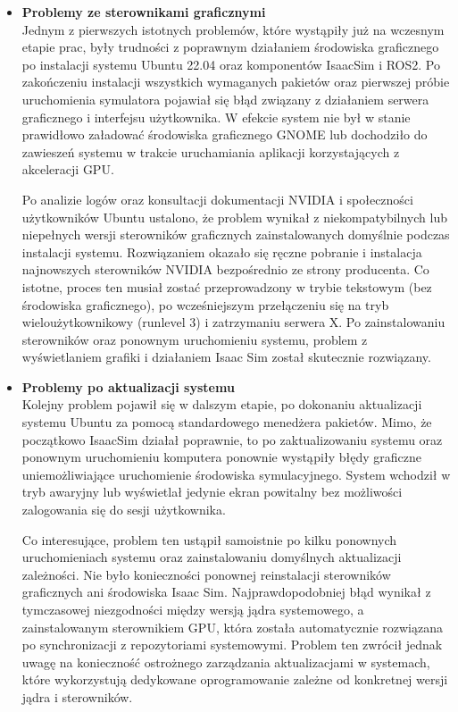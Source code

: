 \documentclass[12pt]{article}
\begin{document}
\begin{itemize}

  \item \textbf{Problemy ze sterownikami graficznymi} \\
  Jednym z pierwszych istotnych problemów, które wystąpiły już na wczesnym etapie prac, były trudności z poprawnym działaniem środowiska graficznego po instalacji systemu Ubuntu 22.04 oraz komponentów IsaacSim i ROS2. Po zakończeniu instalacji wszystkich wymaganych pakietów oraz pierwszej próbie uruchomienia symulatora pojawiał się błąd związany z działaniem serwera graficznego i interfejsu użytkownika. W efekcie system nie był w stanie prawidłowo załadować środowiska graficznego GNOME lub dochodziło do zawieszeń systemu w trakcie uruchamiania aplikacji korzystających z akceleracji GPU.

  Po analizie logów oraz konsultacji dokumentacji NVIDIA i społeczności użytkowników Ubuntu ustalono, że problem wynikał z niekompatybilnych lub niepełnych wersji sterowników graficznych zainstalowanych domyślnie podczas instalacji systemu. Rozwiązaniem okazało się ręczne pobranie i instalacja najnowszych sterowników NVIDIA bezpośrednio ze strony producenta. Co istotne, proces ten musiał zostać przeprowadzony w trybie tekstowym (bez środowiska graficznego), po wcześniejszym przełączeniu się na tryb wieloużytkownikowy (runlevel 3) i zatrzymaniu serwera X. Po zainstalowaniu sterowników oraz ponownym uruchomieniu systemu, problem z wyświetlaniem grafiki i działaniem Isaac Sim został skutecznie rozwiązany.

  \item \textbf{Problemy po aktualizacji systemu} \\
  Kolejny problem pojawił się w dalszym etapie, po dokonaniu aktualizacji systemu Ubuntu za pomocą standardowego menedżera pakietów. Mimo, że początkowo IsaacSim działał poprawnie, to po zaktualizowaniu systemu oraz ponownym uruchomieniu komputera ponownie wystąpiły błędy graficzne uniemożliwiające uruchomienie środowiska symulacyjnego. System wchodził w tryb awaryjny lub wyświetlał jedynie ekran powitalny bez możliwości zalogowania się do sesji użytkownika.

  Co interesujące, problem ten ustąpił samoistnie po kilku ponownych uruchomieniach systemu oraz zainstalowaniu domyślnych aktualizacji zależności. Nie było konieczności ponownej reinstalacji sterowników graficznych ani środowiska Isaac Sim. Najprawdopodobniej błąd wynikał z tymczasowej niezgodności między wersją jądra systemowego, a zainstalowanym sterownikiem GPU, która została automatycznie rozwiązana po synchronizacji z repozytoriami systemowymi. Problem ten zwrócił jednak uwagę na konieczność ostrożnego zarządzania aktualizacjami w systemach, które wykorzystują dedykowane oprogramowanie zależne od konkretnej wersji jądra i sterowników.


\end{itemize}
\end{document}
